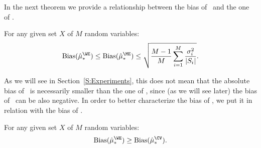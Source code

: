 In the next theorem we provide a relationship between the bias of \WE~and the one of \ME.
\begin{theorem}\label{T:BiasWEME}
 For any given set $X$ of $M$ random variables:
 $$\mathrm{Bias}(\est{\WE}) \leq \mathrm{Bias}(\est{\ME}) \leq \sqrt{\frac{M-1}{M}\sum_{i=1}^M \frac{\sigma_i^2}{|S_i|}}.$$
\end{theorem}
As we will see in Section~\ref{S:Experiments}, this does not mean that the absolute bias of \WE~is necessarily smaller than the one of \ME, since (as we will see later) the bias of \WE~can be also negative.
In order to better characterize the bias of \WE, we put it in relation with the bias of \CV.
\begin{theorem}\label{T:BiasWECV}
 For any given set $X$ of $M$ random variables:
  $$\mathrm{Bias}(\est{\WE}) \geq \mathrm{Bias}(\est{\CV}).$$
\end{theorem}

